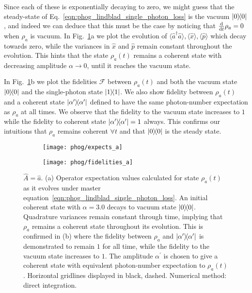 \noindent Since each of these is exponentially decaying to zero, we might guess that the steady-state of Eq.~\ref{eqn:phog_lindblad_single_photon_loss} is the vacuum $\dyad{0}$, and indeed we can deduce that this must be the case by noticing that $\frac{\mathrm{d}}{\mathrm{d}t} \rho_a = 0$ when $\rho_a$ is vacuum. In Fig.~\ref{fig:phog_lindblad_single_photon_loss}a we plot the evolution of $\langle\hat{a}^\dagger \hat{a}\rangle, \langle \hat{x}\rangle, \langle \hat{p}\rangle$ which decay towards zero, while the variances in $\hat{x}$ and $\hat{p}$ remain constant throughout the evolution. This hints that the state $\rho_a\left(t\right)$ remains a coherent state with decreasing amplitude $\alpha\rightarrow0$, until it reaches the vacuum state.

In Fig.~\ref{fig:phog_lindblad_single_photon_loss}b we plot the fidelities $\mathcal{F}$ between $\rho_a\left(t\right)$ and both the vacuum state $\dyad{0}$ and the single-photon state $\dyad{1}$. We also show fidelity between $\rho_a\left(t\right)$ and a coherent state $\dyad{\alpha^\prime}$ defined to have the same photon-number expectation as $\rho_a$ at all times. We observe that the fidelity to the vacuum state increases to $1$ while the fidelity to coherent state $\dyad{\alpha^\prime}=1$ always. This confirms our intuitions that $\rho_a$ remains coherent $\forall t$ and that $\dyad{0}$ is the steady state. %


\begin{figure}[htp]
\centering
	\begin{subfigure}{0.49\linewidth}
	\centering
	\texttt{[image: phog/expects\_a]}
	\caption{}
	\end{subfigure}
	\begin{subfigure}{0.49\linewidth}
	\centering
	\texttt{[image: phog/fidelities\_a]}
	\caption{}
	\end{subfigure}
\caption{\label{fig:phog_lindblad_single_photon_loss}$\hat{A} = \hat{a}$. (a) Operator expectation values calculated for state $\rho_a\left(t\right)$ as it evolves under master equation~\ref{eqn:phog_lindblad_single_photon_loss}. An initial coherent state with $\alpha=3.0$ decays to vacuum state $\dyad{0}$. Quadrature variances remain constant through time, implying that $\rho_a$ remains a coherent state throughout its evolution. This is confirmed in (b) where the fidelity between $\rho_a$ and $\dyad{\alpha^\prime}$ is demonstrated to remain $1$ for all time, while the fidelity to the vacuum state increases to $1$. The amplitude $\alpha^\prime$ is chosen to give a coherent state with equivalent photon-number expectation to $\rho_a\left(t\right)$. Horizontal gridlines displayed in black, dashed. Numerical method: direct integration.}
\end{figure}


